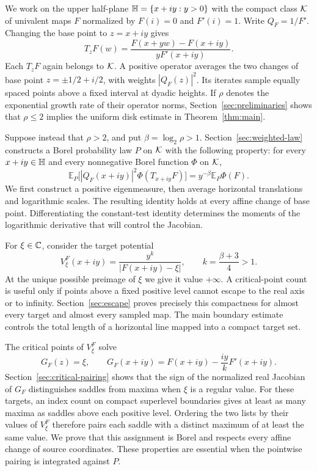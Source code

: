 We work on the upper half-plane $\mathbb H=\{x+iy:y>0\}$ with the compact
class $\mathcal K$ of univalent maps $F$ normalized by $F(i)=0$ and $F'(i)=1$.
Write $Q_F=1/F'$. Changing the base point to $z=x+iy$ gives
\[
 T_zF(w)=\frac{F(x+yw)-F(x+iy)}{yF'(x+iy)}.
\]
Each $T_zF$ again belongs to $\mathcal K$. A positive operator averages the
two changes of base point $z=\pm1/2+i/2$, with weights $|Q_F(z)|^2$.
Its iterates sample equally spaced points above a fixed interval at
dyadic heights. If $\rho$ denotes the exponential growth rate of their
operator norms, Section~\ref{sec:preliminaries} shows that $\rho\le2$
implies the uniform disk estimate in Theorem~\ref{thm:main}.

Suppose instead that $\rho>2$, and put $\beta=\log_2\rho>1$.
Section~\ref{sec:weighted-law} constructs a Borel probability law $P$
on $\mathcal K$ with the following property: for every $x+iy\in\mathbb H$ and
every nonnegative Borel function $\Phi$ on $\mathcal K$,
\[
 \mathbb E_P\bigl[|Q_F(x+iy)|^2\Phi(T_{x+iy}F)\bigr]
       =y^{-\beta}\mathbb E_P\Phi(F).
\]
We first construct a positive eigenmeasure, then average horizontal
translations and logarithmic scales. The resulting identity holds at
every affine change of base point. Differentiating the constant-test
identity determines the moments of the logarithmic derivative that
will control the Jacobian.

For $\xi\in\mathbb C$, consider the target potential
\[
 V_\xi^F(x+iy)=\frac{y^k}{|F(x+iy)-\xi|},
 \qquad k=\frac{\beta+3}{4}>1.
\]
At the unique possible preimage of $\xi$ we give it value $+\infty$.
A critical-point count is useful only if points above a fixed positive
level cannot escape to the real axis or to infinity. Section~\ref{sec:escape}
proves precisely this compactness for almost every target and almost
every sampled map. The main boundary estimate controls the total length
of a horizontal line mapped into a compact target set.

The critical points of $V_\xi^F$ solve
\[
 G_F(z)=\xi,\qquad G_F(x+iy)=F(x+iy)-\frac{iy}{k}F'(x+iy).
\]
Section~\ref{sec:critical-pairing} shows that the sign of the normalized
real Jacobian of $G_F$ distinguishes saddles from maxima when $\xi$
is a regular value. For these targets, an index count on compact
superlevel boundaries gives at least as many maxima as saddles above
each positive level. Ordering the two lists by their values of $V_\xi^F$
therefore pairs each saddle with a distinct maximum of at least the
same value. We prove that this assignment is Borel and respects every
affine change of source coordinates. These properties are essential
when the pointwise pairing is integrated against $P$.

